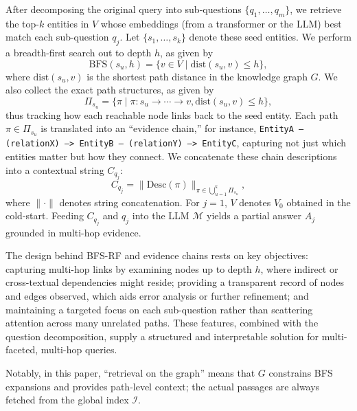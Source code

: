 \documentclass[runningheads]{llncs}
\begin{document}
After decomposing the original query into sub-questions \(\{q_1,\ldots,q_m\}\), we retrieve the top-\(k\) entities in \(V\) whose embeddings (from a transformer or the LLM) best match each sub-question \(q_j\). Let \(\{s_1,\ldots,s_k\}\) denote these seed entities. We perform a breadth-first search out to depth \(h\), as given by
\begin{equation}
\label{eq:bfs}
\mathrm{BFS}(s_u, h) = \bigl\{ v \in V \;\big|\; \mathrm{dist}(s_u,v) \le h \bigr\},
\end{equation}
where \(\mathrm{dist}(s_u,v)\) is the shortest path distance in the knowledge graph \(G\). 
We also collect the exact path structures, as given by
\begin{equation}
\Pi_{s_u} \!\!=\!\! \{\pi \!\mid\! \pi \colon s_u \!\to \!\cdots\!\to\! v, \mathrm{dist}(s_u,v)\!\le\! h\},
\end{equation}
thus tracking how each reachable node links back to the seed entity. Each path \(\pi \in \Pi_{s_u}\) is translated into an ``evidence chain,'' for instance, \texttt{EntityA -- (relationX) --> EntityB -- (relationY) --> EntityC}, capturing not just which entities matter but how they connect. 
We concatenate these chain descriptions into a contextual string \(C_{q_j}\):
\begin{equation}
\label{eq:concatenate_context}
C_{q_j} = \bigl\|\mathrm{Desc}(\pi)\bigr\|_{\pi \in \bigcup_{u=1}^k \Pi_{s_u}},
\end{equation}
where \(\|\cdot\|\) denotes string concatenation. For \(j=1\), \(V\) denotes \(V_0\) obtained in the cold-start.
Feeding \(C_{q_j}\) and \(q_j\) into the LLM \(\mathcal{M}\) yields a partial answer \(A_j\) grounded in multi-hop evidence. 

The design behind BFS-RF and evidence chains rests on key objectives: capturing multi-hop links by examining nodes up to depth \(h\), where indirect or cross-textual dependencies might reside; providing a transparent record of nodes and edges observed, which aids error analysis or further refinement; and maintaining a targeted focus on each sub-question rather than scattering attention across many unrelated paths. These features, combined with the question decomposition, supply a structured and interpretable solution for multi-faceted, multi-hop queries.

Notably, in this paper, “retrieval on the graph” means that \(G\) constrains BFS expansions and provides path-level context; the actual passages are always fetched from the global index \(\mathcal{I}\).
\end{document}
